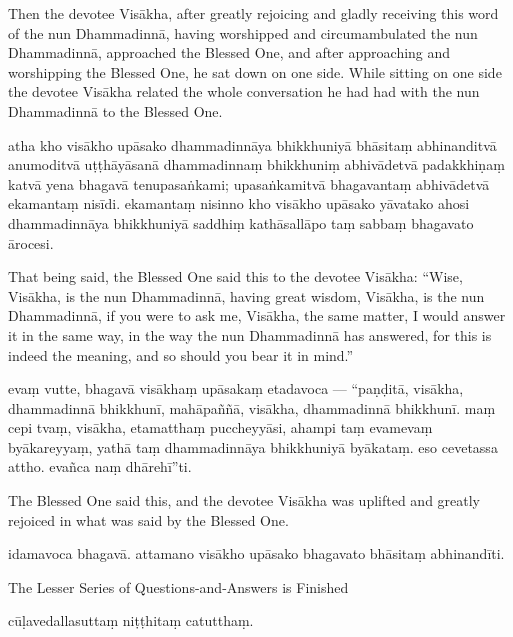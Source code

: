 \begin{samepage}
\begin{leftcolumn*}
Then the devotee Visākha, after greatly rejoicing and gladly receiving this word of the nun Dhammadinnā, having worshipped and circumambulated the nun Dhammadinnā, approached the Blessed One, and after approaching and worshipping the Blessed One, he sat down on one side. While sitting on one side the devotee Visākha related the whole conversation he had had with the nun Dhammadinnā to the Blessed One.
\end{leftcolumn*}

\begin{rightcolumn}
atha kho visākho upāsako dhammadinnāya bhikkhuniyā bhāsitaṃ abhinanditvā anumoditvā uṭṭhāyāsanā dhammadinnaṃ bhikkhuniṃ abhivādetvā padakkhiṇaṃ katvā yena bhagavā tenupasaṅkami; upasaṅkamitvā bhagavantaṃ abhivādetvā ekamantaṃ nisīdi. ekamantaṃ nisinno kho visākho upāsako yāvatako ahosi dhammadinnāya bhikkhuniyā saddhiṃ kathāsallāpo taṃ sabbaṃ bhagavato ārocesi.
\end{rightcolumn}
\end{samepage}

\begin{samepage}
\begin{leftcolumn*}
That being said, the Blessed One said this to the devotee Visākha: “Wise, Visākha, is the nun Dhammadinnā, having great wisdom, Visākha, is the nun Dhammadinnā, if you were to ask me, Visākha, the same matter, I would answer it in the same way, in the way the nun Dhammadinnā has answered, for this is indeed the meaning, and so should you bear it in mind.”
\end{leftcolumn*}

\begin{rightcolumn}
evaṃ vutte, bhagavā visākhaṃ upāsakaṃ etadavoca — “paṇḍitā, visākha, dhammadinnā bhikkhunī, mahāpaññā, visākha, dhammadinnā bhikkhunī. maṃ cepi tvaṃ, visākha, etamatthaṃ puccheyyāsi, ahampi taṃ evamevaṃ byākareyyaṃ, yathā taṃ dhammadinnāya bhikkhuniyā byākataṃ. eso cevetassa attho. evañca naṃ dhārehī”ti.
\end{rightcolumn}
\end{samepage}

\begin{samepage}
\begin{leftcolumn*}
The Blessed One said this, and the devotee Visākha was uplifted and greatly rejoiced in what was said by the Blessed One.
\end{leftcolumn*}

\begin{rightcolumn}
idamavoca bhagavā. attamano visākho upāsako bhagavato bhāsitaṃ abhinandīti.
\end{rightcolumn}
\end{samepage}

\begin{samepage}
\begin{leftcolumn*}
The Lesser Series of Questions-and-Answers is Finished
\end{leftcolumn*}

\begin{rightcolumn}
cūḷavedallasuttaṃ niṭṭhitaṃ catutthaṃ.
\end{rightcolumn}
\end{samepage}

